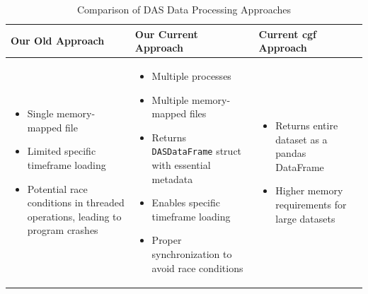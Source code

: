 \begin{table}[htbp]
\centering
\begin{tabular}{p{}|p{}|p{}}
\hline
\textbf{Our Old Approach} & \textbf{Our Current Approach} & \textbf{Current \acrshort{cgf} Approach} \\
\hline
\begin{itemize}[leftmargin=*]
    \item Single memory-mapped file
    \item Limited specific timeframe loading
    \item Potential race conditions in threaded operations, leading to program crashes
\end{itemize}
&
\begin{itemize}[leftmargin=*]
    \item Multiple processes
    \item Multiple memory-mapped files
    \item Returns \texttt{DASDataFrame} struct with essential metadata
    \item Enables specific timeframe loading
    \item Proper synchronization to avoid race conditions
\end{itemize}
&
\begin{itemize}[leftmargin=*]
    \item Returns entire dataset as a pandas DataFrame
    \item Higher memory requirements for large datasets
\end{itemize} \\
\hline
\end{tabular}
\caption{Comparison of DAS Data Processing Approaches}
\label{tab:das-comparison}
\end{table}


